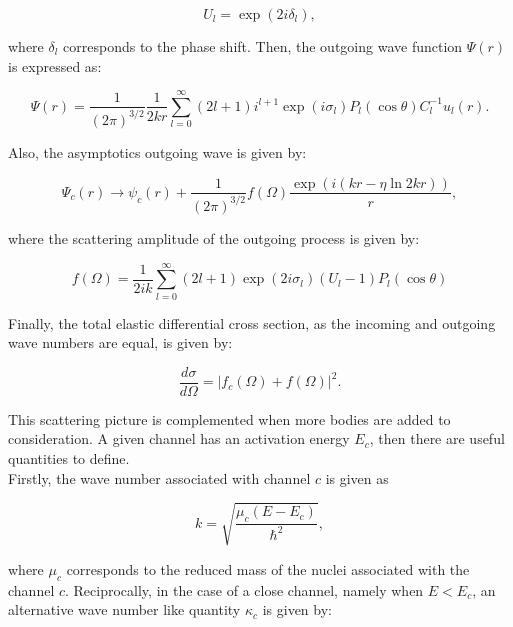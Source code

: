 \documentclass[openany]{book}
\begin{document}
\begin{equation}\label{rmatrix_coulombPsi_collision}
	U_l = \exp {(2i\delta_l)},
\end{equation}

where $\delta_l$ corresponds to the phase shift. Then, the outgoing wave function $\Psi(r)$ is expressed as:

 \begin{equation}\label{rmatrix_coulombPsi_outgoing}
	\Psi(r) = \frac{1}{(2\pi)^{3/2}} \frac{1}{2kr} \sum_{l=0}^{\infty} {(2l + 1)i^{l+1} \exp {(i\sigma_l)} P_l(\cos \theta) C^{-1}_l u_l(r) }.
\end{equation}

Also, the asymptotics outgoing wave is given by: 

 \begin{equation}\label{rmatrix_coulombPsi_outgoing_asymptotics}
		\Psi_c(r) \rightarrow  \psi_c(r) + \frac{1}{(2\pi)^{3/2}} f(\Omega) \frac{\exp {(i(kr - \eta \ln {2kr}))}}{r},
\end{equation}

where the scattering amplitude of the outgoing process is given by: 

 \begin{equation}\label{rmatrix_coulombPsi_outgoing_scatteringAmplitude}
	f(\Omega) = \frac{1}{2ik} \sum_{l=0}^{\infty} {(2l+1)\exp {(2i\sigma_l) (U_l - 1)P_l(\cos \theta) }}
\end{equation}

Finally, the total elastic differential cross section, as the incoming and outgoing wave numbers are equal, is given by: 

 \begin{equation}\label{rmatrix_coulombPsi_total_scatteringAmplitude}
	\frac{d\sigma}{d\Omega} = |f_c(\Omega) + f(\Omega)|^2.
\end{equation}

This scattering picture is complemented when more bodies are added to consideration. A given channel has an activation energy $E_c$, then there are useful quantities to define. \\

Firstly, the wave number associated with channel $c$ is given as 

\begin{equation}\label{rmatrix_channels_waveNumber}
	k = \sqrt{\frac{\mu_c(E - E_c)}{\hbar^2}},
\end{equation}

where $\mu_c$ corresponds to the reduced mass of the nuclei associated with the channel $c$. Reciprocally, in the case of a close channel, namely when $E < E_c$, an alternative wave number like quantity $\kappa_c$ is given by:
\end{document}
